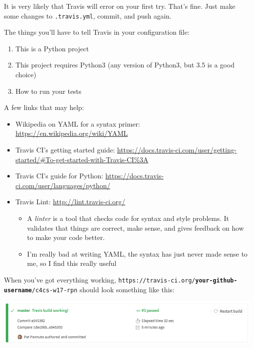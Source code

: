 \documentclass{article}
\begin{document}
It is very likely that Travis will error on your first try. That's fine. Just
make some changes to \texttt{.travis.yml}, commit, and push again.

The things you'll have to tell Travis in your configuration file:
\begin{enumerate}
  \item This is a Python project
  \item This project requires Python3 (any version of Python3, but 3.5 is a
    good choice)
  \item How to run your tests
\end{enumerate}

A few links that may help:
\begin{itemize}
  \item Wikipedia on YAML for a syntax primer: \url{https://en.wikipedia.org/wiki/YAML}
  \item Travis CI's getting started guide:
    \url{https://docs.travis-ci.com/user/getting-started/#To-get-started-with-Travis-CI\%3A}
  \item Travis CI's guide for Python:
    \url{https://docs.travis-ci.com/user/languages/python/}
  \item Travis Lint: \url{http://lint.travis-ci.org/}
    \begin{itemize}
      \item A \emph{linter} is a tool that checks code for syntax and style
        problems. It validates that things are correct, make sense, and gives
        feedback on how to make your code better.
      \item I'm really bad at writing YAML, the syntax has just never made
        sense to me, so I find this really useful
    \end{itemize}
\end{itemize}

When you've got everything working,
\texttt{https://travis-ci.org/\textbf{your-github-username}/c4cs-w17-rpn}
should look something like this:

\includegraphics[width=\linewidth]{travis-rpn-working}


\vfill
\end{document}
